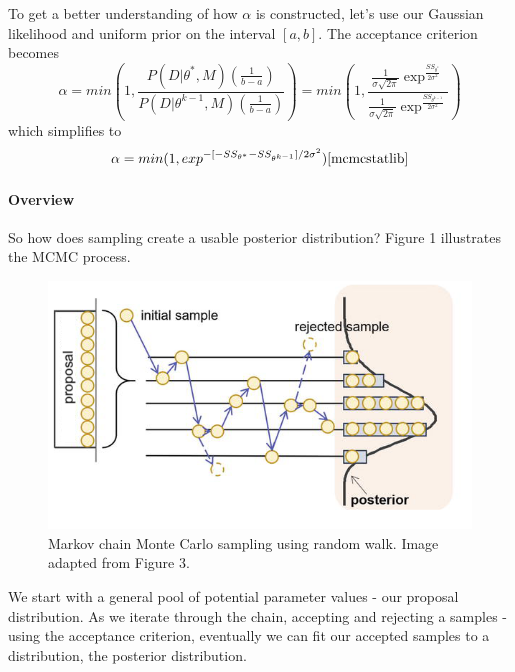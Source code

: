 \par To get a better understanding of how $\alpha$ is constructed, let's use our Gaussian likelihood and uniform prior on the interval $[a, b]$. The acceptance criterion becomes
\begin{equation} \label{eq:11mcmc}
\alpha = min(1, \frac{P(D|\theta^*, M)(\frac{1}{b-a})}{P(D|\theta^{k-1},M)(\frac{1}{b-a})}) = min(1, \frac{\frac{1}{\sigma \sqrt{2\pi}} \exp^{\frac{SS_{\theta^*}}{{2\sigma^2}}}}{\frac{1}{\sigma \sqrt{2\pi}} \exp^{\frac{SS_{\theta^{k-1}}}{{2\sigma^2}}}})
\end{equation}
which simplifies to
\begin{equation} \label{eq:12mcmc}
    \alpha = min(1, exp^{-[-SS_{\theta^*} - SS_{\theta^{k-1}}]/2\sigma^2}) \cite{mcmcstatlib}
\end{equation}
\paragraph{Overview} So how does sampling create a usable posterior distribution? Figure 1 illustrates the MCMC process.
\begin{figure}[H]
    \centering
    \includegraphics[width=15cm]{MCMC_figs/mcmc_procedure.png}
    \caption{Markov chain Monte Carlo sampling using random walk. Image adapted from \cite{mcmcFig} Figure 3.}
\end{figure}
We start with a general pool of potential parameter values - our proposal distribution. As we iterate through the chain, accepting and rejecting a samples - using the acceptance criterion, eventually we can fit our accepted samples to a distribution, the posterior distribution.
